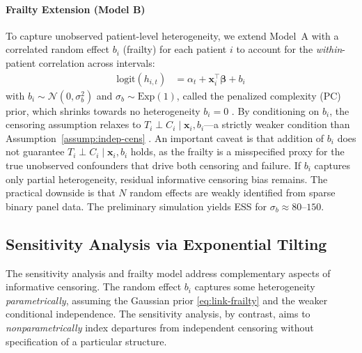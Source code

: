 \documentclass[twoside,11pt]{article}
\newcommand{\bx}{\mathbf{x}}
\begin{document}
\paragraph{Frailty Extension (Model B)} \label{sc:frailty}
To capture unobserved patient-level heterogeneity, we extend Model~A with a correlated random effect $b_i$ (frailty) for each patient $i$ to account for the \emph{within}-patient correlation across intervals:
\begin{align}
    \text{logit}(h_{i,t}) &= \alpha_t + \bx_i^\top \boldsymbol{\beta} + b_i
    \label{eq:link-frailty}
\end{align}
with $b_i \sim \mathcal{N}(0, \sigma_b^2)$ and $\sigma_b \sim \mathrm{Exp}(1)$, called the penalized complexity (PC) prior, which shrinks towards no heterogeneity $b_i = 0$ \citep{simpson-pc-priors}. By conditioning on $b_i$, the censoring assumption relaxes to $T_i \perp C_i \mid \bx_i, b_i$---a strictly weaker condition than Assumption~\ref{assump:indep-cens} \citep{daniels2008}. An important caveat is that addition of $b_i$ does not guarantee $T_i \perp C_i \mid \bx_i, b_i$ holds, as the frailty is a misspecified proxy for the true unobserved confounders that drive both censoring and failure. If $b_i$ captures only partial heterogeneity, residual informative censoring bias remains. The practical downside is that $N$ random effects are weakly identified from sparse binary panel data. The preliminary simulation yields ESS for $\sigma_b \approx 80$--$150$.
 

\subsection{Sensitivity Analysis via Exponential Tilting} \label{sc:sensitivity}
The sensitivity analysis and frailty model address complementary aspects of informative censoring. The random effect \(b_i\) captures some heterogeneity \emph{parametrically}, assuming the Gaussian prior \eqref{eq:link-frailty} and the weaker conditional independence. The sensitivity analysis, by contrast, aims to \emph{nonparametrically} index departures from independent censoring without specification of a particular structure.
 
\end{document}
